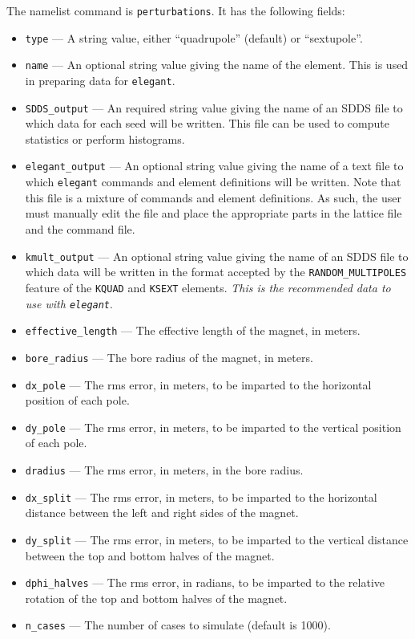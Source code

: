 \documentclass[11pt]{article}
\begin{document}
\begin{itemize}
The namelist command is {\tt perturbations}.  It has the following fields:
\begin{itemize}
\item {\tt type} --- A string value, either ``quadrupole'' (default) or ``sextupole''.
\item {\tt name} --- An optional string value giving the name of the element.  This is
  used in preparing data for {\tt elegant}.
\item {\tt SDDS\_output} --- An required string value giving the name of an SDDS file to which
  data for each seed will be written.  This file can be used to compute statistics or perform
  histograms.
\item {\tt elegant\_output} --- An optional string value giving the name of a text file to which
  {\tt elegant} commands and element definitions will be written.  Note that this file is a mixture
  of commands and element definitions.  As such, the user must manually edit the file and place the
  appropriate parts in the lattice file and the command file.
\item {\tt kmult\_output} --- An optional string value giving the name of an SDDS file to which
  data will be written in the format accepted by the {\tt RANDOM\_MULTIPOLES} feature of the {\tt KQUAD}
  and {\tt KSEXT} elements.  {\em This is the recommended data to use with {\tt elegant}}.
\item {\tt effective\_length} --- The effective length of the magnet, in meters.
\item {\tt bore\_radius} --- The bore radius of the magnet, in meters.
\item {\tt dx\_pole} --- The rms error, in meters, to be imparted to the horizontal position of each pole.
\item {\tt dy\_pole} --- The rms error, in meters, to be imparted to the vertical position of each pole.
\item {\tt dradius} --- The rms error, in meters, in the bore radius.
\item {\tt dx\_split} --- The rms error, in meters, to be imparted to the horizontal distance between the
  left and right sides of the magnet.
\item {\tt dy\_split} --- The rms error, in meters, to be imparted to the vertical distance between the
  top and bottom halves of the magnet.
\item {\tt dphi\_halves} --- The rms error, in radians, to be imparted to the relative rotation of the top
  and bottom halves of the magnet.
\item {\tt n\_cases} --- The number of cases to simulate (default is 1000).

\end{itemize}
\end{itemize}
\end{document}
